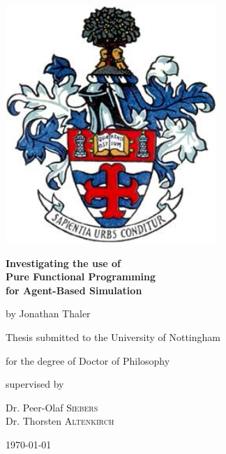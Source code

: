 \documentclass[oneside]{book}
\begin{document}
\begin{titlepage}
	\centering
	\includegraphics[width=0.60\textwidth]{./logo/coat_of_arms.jpg}\par\vspace{1cm}
	\vspace{1.5cm}
	{\huge\bfseries Investigating the use of \\ Pure Functional Programming \\ for Agent-Based Simulation \par}
	\vspace{2cm}
	{\Large by Jonathan Thaler \par}
	\vfill
	Thesis submitted to the University of Nottingham \par
	for the degree of Doctor of Philosophy \par
	
	\vfill
	
	\small
	supervised by\par
	Dr. Peer-Olaf \textsc{Siebers} \\
	Dr. Thorsten \textsc{Altenkirch}

	\vfill
	{\large \today\par}
\end{titlepage}
\end{document}
